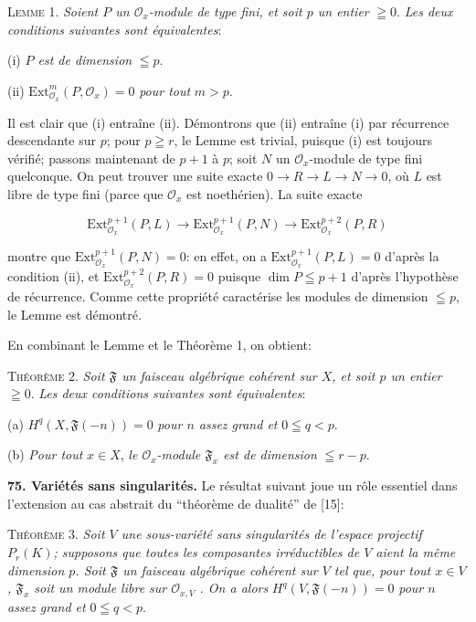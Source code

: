 \textsc{Lemme} 1. \textit{Soient $P$ un $\mathcal{O}_x$-module de type fini, et soit $p$ un entier} $\geqq 0$. \textit{Les deux conditions suivantes sont équivalentes}:

(i) \textit{$P$ est de dimension} $\leqq p$.

(ii) $\mathrm{Ext}_{\mathcal{O}_x}^m(P, \mathcal{O}_x) = 0$ \textit{pour tout} $m > p$.

Il est clair que (i) entraîne (ii). Démontrons que (ii) entraîne (i) par récurrence descendante sur $p$; pour $p \geqq r$, le Lemme est trivial, puisque (i) est toujours vérifié; passons maintenant de $p + 1$ à $p$; soit $N$ un $\mathcal{O}_x$-module de type fini quelconque. On peut trouver une suite exacte $0 \rightarrow R \rightarrow L \rightarrow N \rightarrow 0$, où $L$ est libre de type fini (parce que $\mathcal{O}_x$ est noethérien). La suite exacte

\begin{equation*}
\mathrm{Ext}_{\mathcal{O}_x}^{p+1}(P, L) \rightarrow \mathrm{Ext}_{\mathcal{O}_x}^{p+1}(P, N) \rightarrow \mathrm{Ext}_{\mathcal{O}_x}^{p+2}(P, R)
\end{equation*}

montre que $\mathrm{Ext}_{\mathcal{O}_x}^{p+1}(P, N) = 0$: en effet, on a $\mathrm{Ext}_{\mathcal{O}_x}^{p+1}(P, L) = 0$ d'après la condition (ii), et $\mathrm{Ext}_{\mathcal{O}_x}^{p+2}(P, R) = 0$ puisque $\dim P \leqq p + 1$ d'après l'hypothèse de récurrence. Comme cette propriété caractérise les modules de dimension $\leqq p$, le Lemme est démontré.

En combinant le Lemme et le Théorème 1, on obtient:

\textsc{Théorème} 2. \textit{Soit $\mathfrak{F}$ un faisceau algébrique cohérent sur $X$, et soit $p$ un entier} $\geqq 0$. \textit{Les deux conditions suivantes sont équivalentes}:

(a) $H^q(X, \mathfrak{F}(-n)) = 0$ \textit{pour $n$ assez grand et} $0 \leqq q < p$.

(b) \textit{Pour tout} $x \in X$, \textit{le $\mathcal{O}_x$-module $\mathfrak{F}_x$ est de dimension} $\leqq r - p$.

\textbf{75. Variétés sans singularités.} Le résultat suivant joue un rôle essentiel dans l'extension au cas abstrait du ``théorème de dualité'' de [15]:

\textsc{Théorème} 3. \textit{Soit $V$ une sous-variété sans singularités de l'espace projectif $P_r(K)$; supposons que toutes les composantes irréductibles de $V$ aient la même dimension $p$. Soit $\mathfrak{F}$ un faisceau algébrique cohérent sur $V$ tel que, pour tout $x \in V$, $\mathfrak{F}_x$ soit un module libre sur $\mathcal{O}_{x,V}$ . On a alors} $H^q(V, \mathfrak{F}(-n)) = 0$ \textit{pour $n$ assez grand et} $0 \leqq q < p$.

